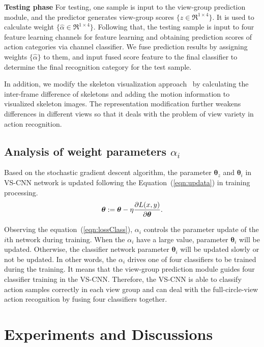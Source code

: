 \documentclass[journal]{IEEEtran}
\begin{document}
\textbf{Testing phase}
For testing, one sample is input to the view-group prediction module, and the predictor generates view-group scores $\{ \widehat{z}\in \Re^{1\times 4} \}$. It is used to calculate weight $\{\widehat{\alpha}\in \Re^{1\times 4}\}$. Following that, the testing sample is input to four feature learning channels for feature learning and obtaining prediction scores of action categories via channel classifier. We fuse prediction results by assigning weights $\{\widehat{\alpha}\}$ to them, and input fused score feature to the final classifier to determine the final recognition category for the test sample.


In addition, we modify the skeleton visualization approach~\cite{EnhancedSK2017} by calculating the inter-frame difference of skeletons and adding the motion information to visualized skeleton images. The representation modification further weakens differences in different views so that it deals with the problem of view variety in action recognition.

\subsection{Analysis of weight parameters $\alpha_i$}
Based on the stochastic gradient descent algorithm, the parameter $\bm{\theta}_z$ and $\bm{\theta}_i$ in VS-CNN network is updated following the Equation~(\ref{eqn:updata}) in training processing.
\begin{equation} \footnotesize
\bm{\theta}:  = \bm{\theta} - \eta \frac{\partial L(x,y)}{\partial \bm{\theta}}.
\label{eqn:updata}
\end{equation}



Observing the equation~(\ref{eqn:lossClass}), $\alpha_i$ controls the parameter update of the $i$th network during training. When the $\alpha_i$ have a large value, parameter $\bm{\theta}_i$ will be updated. Otherwise, the classifier network parameter $\bm{\theta}_i$ will be updated slowly or not be updated. In other words, the $\alpha_i$ drives one of four classifiers to be trained during the training. It means that the view-group prediction module guides four classifier training in the VS-CNN. Therefore, the VS-CNN is able to classify action samples correctly in each view group and can deal with the full-circle-view action recognition by fusing four classifiers together.

\section{Experiments and Discussions}
\label{sec:experiment}
\end{document}
